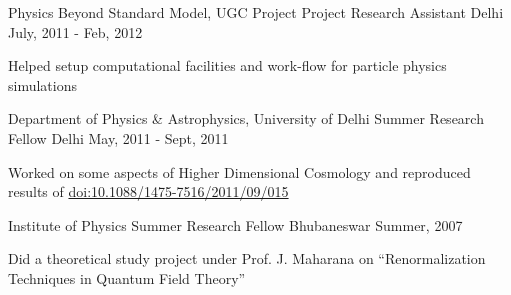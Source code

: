\begin{cventries}
	
	\cventry
	{Physics Beyond Standard Model, UGC Project} %
	{Project Research Assistant} %
	{Delhi} %
	{July, 2011 - Feb, 2012} %
	{
		\begin{cvitems} 
			\item {Helped setup computational facilities and work-flow for particle physics simulations}
		\end{cvitems}
	}
	
\end{cventries}
\begin{cventries}
	
	\cventry
	{Department of Physics \& Astrophysics, University of Delhi} %
	{Summer Research Fellow} %
	{Delhi} %
	{May, 2011 - Sept, 2011} %
	{
		\begin{cvitems} 
			\item {Worked on some aspects of Higher Dimensional Cosmology and reproduced results of \href{https://doi.org/10.1088/1475-7516/2011/09/015}{doi:10.1088/1475-7516/2011/09/015}}
		\end{cvitems}
	}	
\end{cventries}

\begin{cventries}
	
	\cventry
	{Institute of Physics} %
	{Summer Research Fellow} %
	{Bhubaneswar} %
	{Summer, 2007} %
	{
		\begin{cvitems} 
			\item {Did a theoretical study project under Prof. J. Maharana on
				“Renormalization Techniques in Quantum Field Theory”}
		\end{cvitems}
	}
\end{cventries}
	
